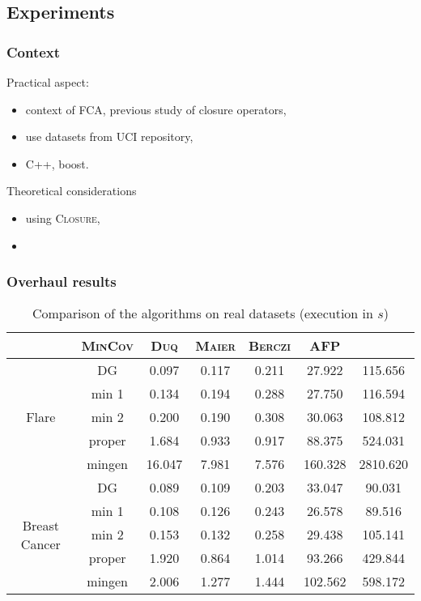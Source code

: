 
\subsection{Experiments}

\begin{frame}
\frametitle{Context}

Practical aspect:
\begin{itemize}
	\item context of FCA, previous study of closure operators,	
	\item use datasets from UCI repository,	
	\item C++, boost.
	
\end{itemize}

\vspace{1.2em}

Theoretical considerations
\begin{itemize}
	\item using \textsc{Closure},
	\item 
\end{itemize}

\end{frame}

\begin{frame}[fragile]
\frametitle{Overhaul results}

{\small
\begin{table}[H]
	\centering
	\begin{tabular}{| c | c || c | c | c | c | c |}
		\hline \rowcolor{clouds}
		\multicolumn{2}{c}{$\I$} & \textsc{MinCov} & \textsc{Duq} & \textsc{Maier} & \textsc{Berczi} & \textsc{AFP} \\ \hline
		
		\multirow{5}{*}{Flare}
		& DG           & 0.097 & 0.117 & 0.211 & 27.922 & 115.656 \\
		& min 1 & 0.134 & 0.194 & 0.288 & 27.750 & 116.594 \\
		& min 2 & 0.200 & 0.190 & 0.308 & 30.063 & 108.812 \\
		& proper       & 1.684 & 0.933 & 0.917 & 88.375 & 524.031 \\
		& mingen       & 16.047 & 7.981 & 7.576 & 160.328 & 2810.620 \\ \hline
		
		\multirow{5}{*}{Breast Cancer}
		& DG           & 0.089 & 0.109 & 0.203 & 33.047 & 90.031 \\
		& min 1 & 0.108 & 0.126 & 0.243 & 26.578 & 89.516 \\
		& min 2 & 0.153 & 0.132 & 0.258 & 29.438 & 105.141 \\
		& proper       & 1.920 & 0.864 & 1.014 & 93.266 & 429.844 \\
		& mingen       & 2.006 & 1.277 & 1.444 & 102.562 & 598.172 \\ \hline
		
	\end{tabular} 
	\caption{Comparison of the algorithms on real datasets (execution in $s$)}
	\label{tab:real-exe}
\end{table}
}

\end{frame}

